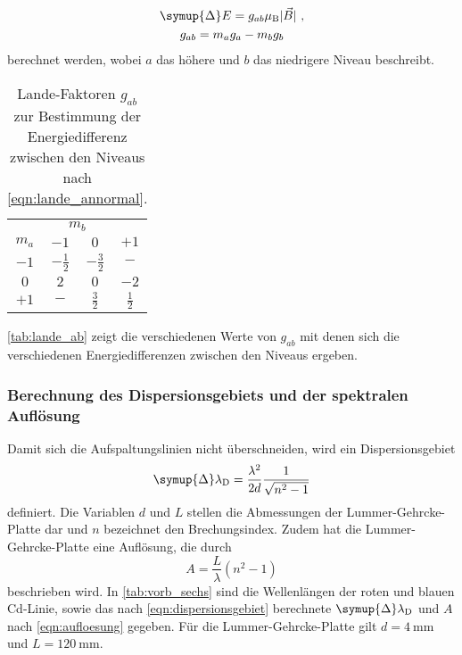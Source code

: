    \begin{gather}
        \symup{\Delta} E = g_{ab} \mu_\text{B} \lvert \vec{B} \rvert \ ,
        \label{eqn:energiedifferenz_annormal}\\
        g_{ab} = m_a g_a - m_b g_b
        \label{eqn:lande_annormal}
    \end{gather}
    berechnet werden,
    wobei $a$ das höhere und $b$ das niedrigere Niveau beschreibt.
    \begin{table}
        \centering
        \caption{Lande-Faktoren $g_{ab}$ zur Bestimmung der Energiedifferenz zwischen den Niveaus nach \autoref{eqn:lande_annormal}.}
        \label{tab:lande_ab}
        \begin{tabular}{c c c c}
            \toprule
            & \multicolumn{2}{c}{$m_b$}  \\
            \cmidrule(lr){2-4}
            {$m_a$} & {$-1$} & {$0$} & {$+1$} \\
            \midrule
            $-1$ & $- \frac{1}{2}$ & $- \frac{3}{2}$ & $-$ \\
            $0$ &  $2$ & $0$ & $-2$ \\
            $+1$ & $-$ & $\frac{3}{2}$ & $\frac{1}{2}$ \\
            \bottomrule
        \end{tabular}
    \end{table}
    \autoref{tab:lande_ab} zeigt die verschiedenen Werte von $g_{ab}$ mit denen sich die verschiedenen Energiedifferenzen zwischen den Niveaus ergeben.

\subsubsection{Berechnung des Dispersionsgebiets und der spektralen Auflösung}

    Damit sich die Aufspaltungslinien nicht überschneiden,
    wird ein Dispersionsgebiet
    \begin{equation}
        \symup{\Delta}\lambda_\text{D} = \frac{\lambda^2}{2d} \frac{1}{\sqrt{n^2 - 1}}
        \label{eqn:dispersionsgebiet}
    \end{equation}
    definiert.
    Die Variablen $d$ und $L$ stellen die Abmessungen der Lummer-Gehrcke-Platte dar und $n$ bezeichnet den Brechungsindex.
    Zudem hat die Lummer-Gehrcke-Platte eine Auflösung,
    die durch
    \begin{equation}
        A = \frac{L}{\lambda} (n^2 -1)
        \label{eqn:aufloesung}
    \end{equation}
    beschrieben wird.
    In \autoref{tab:vorb_sechs} sind die Wellenlängen der roten und blauen Cd-Linie,
    sowie das nach \autoref{eqn:dispersionsgebiet} berechnete $\symup{\Delta}\lambda_\text{D}$ und $A$ nach \autoref{eqn:aufloesung} gegeben.
    Für die Lummer-Gehrcke-Platte gilt $d = \SI{4}{\milli\meter}$ und $L = \SI{120}{\milli\meter}$.

